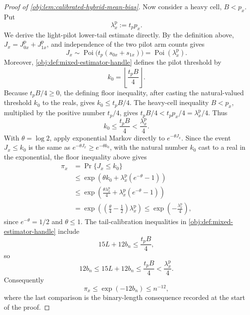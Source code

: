 \begin{proof}[Proof of \cref{obj:lem:calibrated-hybrid-mean-bias}]
Now consider a heavy cell, \(B<p_x\).  Put
\[
\lambda_x^{\mathrm p}:=t_p p_x.
\]
We derive the light-pilot lower-tail estimate directly.  By the definition above, \(J_x=J_{0x}^{\mathrm p}+J_{1x}^{\mathrm p}\), and independence of the two pilot arm counts gives
\[
J_x\sim\operatorname{Poi}\bigl(t_p(s_{0x}+s_{1x})\bigr)
=
\operatorname{Poi}(\lambda_x^{\mathrm p}).
\]
Moreover, \cref{obj:def:mixed-estimator-handle} defines the pilot threshold by
\[
k_0=\left\lfloor\frac{t_pB}{4}\right\rfloor.
\]
Because \(t_pB/4\ge0\), the defining floor inequality, after casting the
natural-valued threshold \(k_0\) to the reals, gives \(k_0\le t_pB/4\).
The heavy-cell inequality \(B<p_x\), multiplied by the positive number
\(t_p/4\), gives \(t_pB/4< t_pp_x/4=\lambda_x^{\mathrm p}/4\).  Thus
\[
k_0\le \frac{t_pB}{4}<\frac{\lambda_x^{\mathrm p}}4.
\]
With \(\theta=\log 2\), apply exponential Markov directly to
\(e^{-\theta J_x}\).  Since the event \(J_x\le k_0\) is the same as
\(e^{-\theta J_x}\ge e^{-\theta k_0}\), with the natural number \(k_0\)
cast to a real in the exponential, the floor inequality above gives
\[
\begin{aligned}
\pi_x
&=\Pr\{J_x\le k_0\} \\
&\le
\exp\!\left(\theta k_0
+\lambda_x^{\mathrm p}(e^{-\theta}-1)\right) \\
&\le
\exp\!\left(\frac{\theta\lambda_x^{\mathrm p}}4
+\lambda_x^{\mathrm p}(e^{-\theta}-1)\right) \\
&=
\exp\!\left(\left(\frac{\theta}{4}-\frac12\right)\lambda_x^{\mathrm p}\right)
\le
\exp\!\left(-\frac{\lambda_x^{\mathrm p}}4\right),
\end{aligned}
\]
since \(e^{-\theta}=1/2\) and \(\theta\le1\).  The tail-calibration inequalities in \cref{obj:def:mixed-estimator-handle} include
\[
15L+12b_n\le \frac{t_pB}{4},
\]
so
\[
12b_n\le 15L+12b_n\le \frac{t_pB}{4}<\frac{\lambda_x^{\mathrm p}}4.
\]
Consequently
\[
\pi_x\le \exp(-12b_n)\le n^{-12},
\]
where the last comparison is the binary-length consequence recorded at the start of the proof. %


\end{proof}
